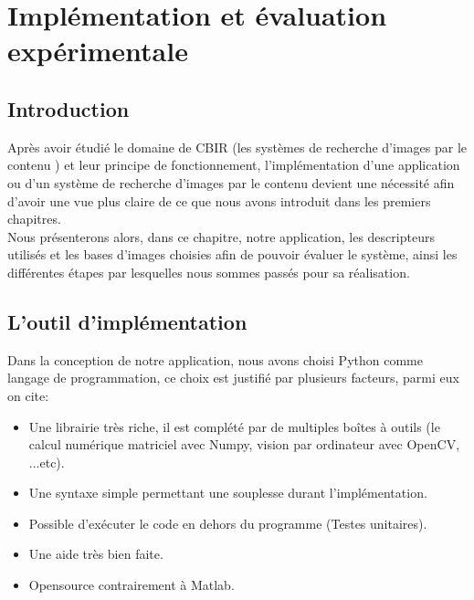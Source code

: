 
\chapter{Implémentation et évaluation expérimentale} %

\label{Chapter4} %


\section{Introduction}
Après avoir étudié le domaine de CBIR (les systèmes de recherche d’images par le contenu ) et leur principe de fonctionnement, l’implémentation d’une application ou d’un système de recherche d’images par le contenu devient une nécessité afin d’avoir une vue plus claire de ce que nous avons introduit dans les premiers chapitres. \\

Nous présenterons alors, dans ce chapitre, notre application,
les descripteurs utilisés et les bases d’images choisies afin de pouvoir évaluer le système, ainsi les différentes étapes par lesquelles nous sommes passés pour sa réalisation.

\section{L'outil d’implémentation}
Dans la conception de notre application, nous avons choisi Python
comme langage de programmation, ce choix est justifié par plusieurs
facteurs, parmi eux on cite:
\begin{itemize}
	\item Une librairie très riche, il est complété par de multiples boîtes à outils (le calcul numérique matriciel avec Numpy, vision par ordinateur avec OpenCV, ...etc).
	\item Une syntaxe simple permettant une souplesse durant l'implémentation.
	\item Possible d’exécuter le code en dehors du programme (Testes unitaires).
	\item Une aide très bien faite.
	\item Opensource contrairement à Matlab.
\end{itemize}

